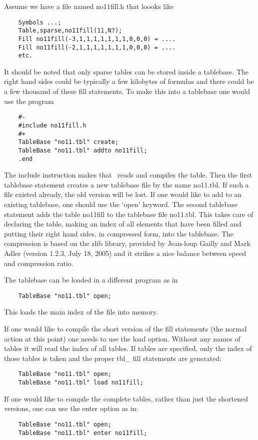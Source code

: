 Assume we have a file named no11fill.h that loooks like
\begin{verbatim}
    Symbols ...;
    Table,sparse,no11fill(11,N?);
    Fill no11fill(-3,1,1,1,1,1,1,1,0,0,0) = ....
    Fill no11fill(-2,1,1,1,1,1,1,1,0,0,0) = ....
    etc.
\end{verbatim}
It should be noted that only sparse tables can be stored 
inside a tablebase. The right hand sides could be typically a few kilobytes 
of formulas and there could be a few thousand of these fill statements. To 
make this into a tablebase one would use the program
\begin{verbatim}
    #-
    #include no11fill.h
    #+
    TableBase "no11.tbl" create;
    TableBase "no11.tbl" addto no11fill;
    .end
\end{verbatim}
The include instruction makes that \FORM\ reads and compiles 
the table. Then the first tablebase statement creates a new tablebase file 
by the name no11.tbl. If such a file existed already, the old version will 
be lost. If one would like to add to an existing tablebase, one should use 
the `open' keyword. The second tablebase statement adds the 
table no11fill to the tablebase file no11.tbl. This takes care of declaring 
the table, making an index of all elements that have been filled and 
putting their right hand sides, in compressed form, into the tablebase. The 
compression is based on the zlib library, provided by Jean-loup 
Gailly and Mark Adler (version 
1.2.3, July 18, 2005) and it strikes a nice balance between speed and 
compression ratio.

The tablebase can be loaded in a different program as in
\begin{verbatim}
    TableBase "no11.tbl" open;
\end{verbatim}
This loads the main index of the file into memory.

If one would like to compile the short version of the fill statements (the 
normal action at this point) one needs to use the load option. 
Without any names of tables it will read the index of all tables. If tables 
are specified, only the index of those tables is taken and the proper 
tbl\_ fill statements are generated:
\begin{verbatim}
    TableBase "no11.tbl" open;
    TableBase "no11.tbl" load no11fill;
\end{verbatim}

If one would like to compile the complete tables, rather 
than just the shortened versions, one can use the enter option as in:
\begin{verbatim}
    TableBase "no11.tbl" open;
    TableBase "no11.tbl" enter no11fill;
\end{verbatim}

